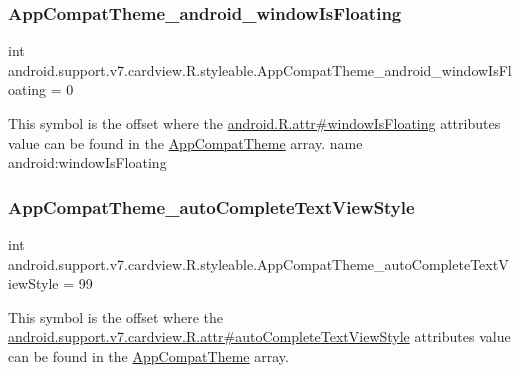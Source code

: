 \subsubsection{\texorpdfstring{App\+Compat\+Theme\+\_\+android\+\_\+window\+Is\+Floating}{AppCompatTheme\_android\_windowIsFloating}}
{\footnotesize\ttfamily int android.\+support.\+v7.\+cardview.\+R.\+styleable.\+App\+Compat\+Theme\+\_\+android\+\_\+window\+Is\+Floating = 0\hspace{0.3cm}{\ttfamily [static]}}

This symbol is the offset where the \hyperlink{}{android.\+R.\+attr\#window\+Is\+Floating} attribute\textquotesingle{}s value can be found in the \hyperlink{classandroid_1_1support_1_1v7_1_1cardview_1_1R_1_1styleable_a52e6f69f954ecc2622d72c0b4d298938}{App\+Compat\+Theme} array.  name android\+:window\+Is\+Floating \mbox{\label{classandroid_1_1support_1_1v7_1_1cardview_1_1R_1_1styleable_ae014b1ac4a3413251376574568270a19}} 
\subsubsection{\texorpdfstring{App\+Compat\+Theme\+\_\+auto\+Complete\+Text\+View\+Style}{AppCompatTheme\_autoCompleteTextViewStyle}}
{\footnotesize\ttfamily int android.\+support.\+v7.\+cardview.\+R.\+styleable.\+App\+Compat\+Theme\+\_\+auto\+Complete\+Text\+View\+Style = 99\hspace{0.3cm}{\ttfamily [static]}}

This symbol is the offset where the \hyperlink{classandroid_1_1support_1_1v7_1_1cardview_1_1R_1_1attr_aa1e3d978cb321b0ef0b2e958b7c0c4b9}{android.\+support.\+v7.\+cardview.\+R.\+attr\#auto\+Complete\+Text\+View\+Style} attribute\textquotesingle{}s value can be found in the \hyperlink{classandroid_1_1support_1_1v7_1_1cardview_1_1R_1_1styleable_a52e6f69f954ecc2622d72c0b4d298938}{App\+Compat\+Theme} array.

